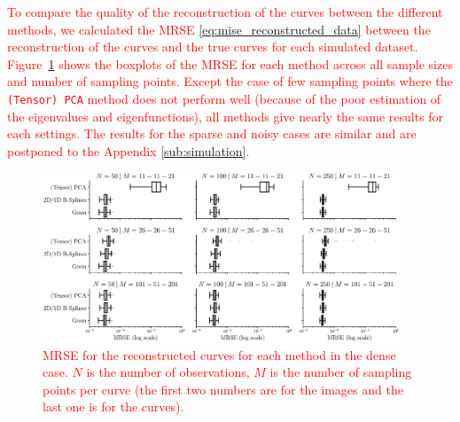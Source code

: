 \begin{results}
\textcolor{red}{To compare the quality of the reconstruction of the curves between the different methods, we calculated the MRSE \eqref{eq:mise_reconstructed_data} between the reconstruction of the curves and the true curves for each simulated dataset. Figure~\ref{fig:mise_mfd_1d} shows the boxplots of the MRSE for each method across all sample sizes and number of sampling points. Except the case of few sampling points where the \texttt{(Tensor) PCA} method does not perform well (because of the poor estimation of the eigenvalues and eigenfunctions), all methods give nearly the same results for each settings. The results for the sparse and noisy cases are similar and are postponed to the Appendix \ref{sub:simulation}.}
\begin{figure}
     \centering
     \includegraphics[width=0.95\textwidth]{figures/MRSE.eps}
    \caption{\textcolor{red}{MRSE for the reconstructed curves for each method in the dense case. $N$ is the number of observations, $M$ is the number of sampling points per curve (the first two numbers are for the images and the last one is for the curves).}}
    \label{fig:mise_mfd_1d}
\end{figure}
\end{results}




